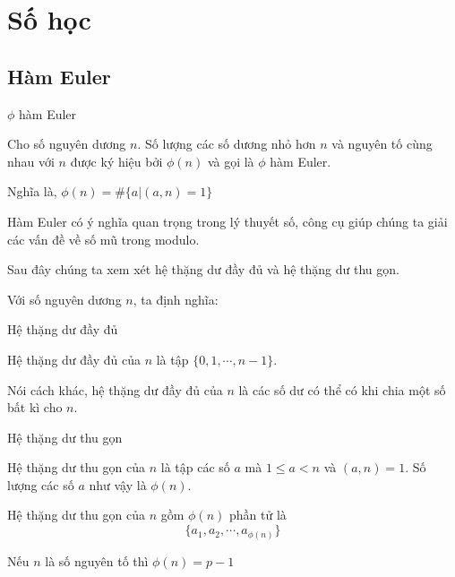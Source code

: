 \section{Số học}

\subsection{Hàm Euler}

\begin{defblock}{$\phi$ hàm Euler}
    
    Cho số nguyên dương $n$. Số lượng các số dương nhỏ hơn $n$ và nguyên tố cùng nhau với $n$ được ký hiệu bởi $\phi(n)$ và gọi là $\phi$ hàm Euler.

    Nghĩa là, $\phi(n) = \# \{ a | (a, n) = 1\}$
\end{defblock}

Hàm Euler có ý nghĩa quan trọng trong lý thuyết số, công cụ giúp chúng ta giải các vấn đề về số mũ trong modulo.

Sau đây chúng ta xem xét hệ thặng dư đầy đủ và hệ thặng dư thu gọn.

Với số nguyên dương $n$, ta định nghĩa:

\begin{defblock}{Hệ thặng dư đầy đủ}

    \begin{definition}
        Hệ thặng dư đầy đủ của $n$ là tập $\{0, 1, \cdots, n-1\}$.
    \end{definition}
\end{defblock}

Nói cách khác, hệ thặng dư đầy đủ của $n$ là các số dư có thể có khi chia một số bất kì cho $n$.

\begin{defblock}{Hệ thặng dư thu gọn}

    \begin{definition}
        Hệ thặng dư thu gọn của $n$ là tập các số $a$ mà $1 \leq a < n$ và $(a, n) = 1$. Số lượng các số $a$ như vậy là $\phi (n)$.  
    \end{definition}

\end{defblock}

\begin{remark}
    Hệ thặng dư thu gọn của $n$ gồm $\phi(n)$ phần tử là $$\{a_1, a_2, \cdots, a_{\phi(n)}\}$$
\end{remark}

\begin{remark}
    Nếu $n$ là số nguyên tố thì $\phi(n) = p-1$
\end{remark}

